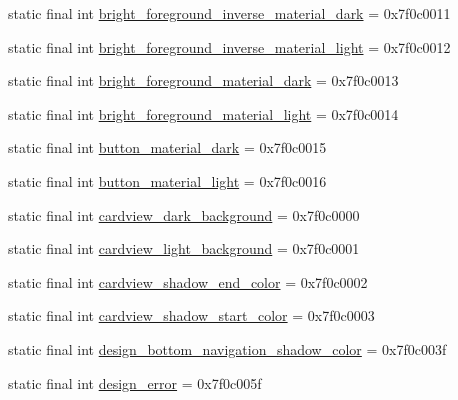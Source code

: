 \begin{CompactItemize}
\item 
static final int \hyperlink{classandroid_1_1support_1_1v7_1_1palette_1_1_r_1_1color_d2d0f6411ad6ac65bf019a1303bbffd0}{bright\_\-foreground\_\-inverse\_\-material\_\-dark} = 0x7f0c0011
\item 
static final int \hyperlink{classandroid_1_1support_1_1v7_1_1palette_1_1_r_1_1color_2f78380758f15c1afd81b1bea558800d}{bright\_\-foreground\_\-inverse\_\-material\_\-light} = 0x7f0c0012
\item 
static final int \hyperlink{classandroid_1_1support_1_1v7_1_1palette_1_1_r_1_1color_7f5d449156a05d5118eb494154fe1421}{bright\_\-foreground\_\-material\_\-dark} = 0x7f0c0013
\item 
static final int \hyperlink{classandroid_1_1support_1_1v7_1_1palette_1_1_r_1_1color_bf40568a6631038e51803cd250247487}{bright\_\-foreground\_\-material\_\-light} = 0x7f0c0014
\item 
static final int \hyperlink{classandroid_1_1support_1_1v7_1_1palette_1_1_r_1_1color_77b2105ffdb7e3917f2b4e0ea5d71bc4}{button\_\-material\_\-dark} = 0x7f0c0015
\item 
static final int \hyperlink{classandroid_1_1support_1_1v7_1_1palette_1_1_r_1_1color_1d53af01c1997b480965dcb1cbfafe97}{button\_\-material\_\-light} = 0x7f0c0016
\item 
static final int \hyperlink{classandroid_1_1support_1_1v7_1_1palette_1_1_r_1_1color_eeb1c56799fac1b1e3ff8c68784e9760}{cardview\_\-dark\_\-background} = 0x7f0c0000
\item 
static final int \hyperlink{classandroid_1_1support_1_1v7_1_1palette_1_1_r_1_1color_2dd76229acf8f61c5313cd6c38dee39a}{cardview\_\-light\_\-background} = 0x7f0c0001
\item 
static final int \hyperlink{classandroid_1_1support_1_1v7_1_1palette_1_1_r_1_1color_db4a9eea34e894b7e07cefc7d16d465f}{cardview\_\-shadow\_\-end\_\-color} = 0x7f0c0002
\item 
static final int \hyperlink{classandroid_1_1support_1_1v7_1_1palette_1_1_r_1_1color_c58cabaa2a297d9666676f5219ac9b26}{cardview\_\-shadow\_\-start\_\-color} = 0x7f0c0003
\item 
static final int \hyperlink{classandroid_1_1support_1_1v7_1_1palette_1_1_r_1_1color_5fa53e706cddf783e276d3e9f4594bf5}{design\_\-bottom\_\-navigation\_\-shadow\_\-color} = 0x7f0c003f
\item 
static final int \hyperlink{classandroid_1_1support_1_1v7_1_1palette_1_1_r_1_1color_8e9a1f7a0bb9036f0ce0a2e85e76843e}{design\_\-error} = 0x7f0c005f
\item 

\end{CompactItemize}
